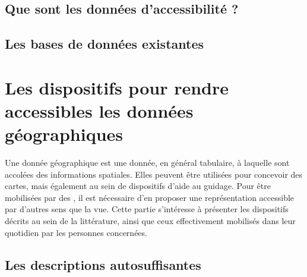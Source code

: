 

\todo{}

\subsection{Que sont les données d'accessibilité ?}

\todo{}

\subsection{Les bases de données existantes}

% 

\todo{}

\section{Les dispositifs pour rendre accessibles les données géographiques}


Une donnée géographique est une donnée, en général tabulaire, à laquelle sont accolées des informations spatiales. Elles peuvent être utilisées pour concevoir des cartes, mais également au sein de dispositifs d'aide au guidage. Pour être mobilisées par des \pcdvs, il est nécessaire d'en proposer une représentation accessible par d'autres sens que la vue. Cette partie s'intéresse à présenter les dispositifs décrits au sein de la littérature, ainsi que ceux effectivement mobilisés dans leur quotidien par les personnes concernées.

\subsection{Les descriptions autosuffisantes}


